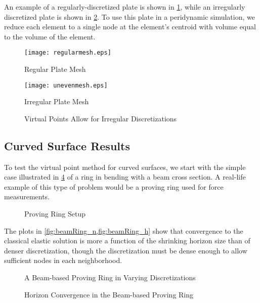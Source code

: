 An example of a regularly-discretized plate is shown in \cref{fig:regularmesh}, while an irregularly discretized plate is shown in \cref{fig:unevenmesh}.
To use this plate in a peridynamic simulation, we reduce each element to a single node at the element's centroid with volume equal to the volume of the element. 
%
\begin{figure}[h]
  \centering
  \texttt{[image: regularmesh.eps]}
  \caption{Regular Plate Mesh}
  \label{fig:regularmesh}
\end{figure}
%
%
\begin{figure}[h]
  \centering
  \texttt{[image: unevenmesh.eps]}
  \caption{Irregular Plate Mesh}
  \label{fig:unevenmesh}
\end{figure}
%
%
\begin{figure}[tbhp]
  \centering
  \resizebox{0.6\linewidth}{!}{}
  \caption{Virtual Points Allow for Irregular Discretizations}
  \label{fig:PlateIrreg}
\end{figure}
%

\FloatBarrier
\subsection{Curved Surface Results}
To test the virtual point method for curved surfaces, we start with the simple case illustrated in \cref{fig:ProvingRing} of a ring in bending with a beam cross section.
A real-life example of this type of problem would be a proving ring used for force measurements.
%
\begin{figure}[tbhp]
  \centering
  
  \caption{Proving Ring Setup}
  \label{fig:ProvingRing}
\end{figure}
%
The plots in \cref{fig:beamRing_n,fig:beamRing_h} show that convergence to the classical elastic solution is more a function of the shrinking horizon size than of denser discretization, though the discretization must be dense enough to allow sufficient nodes in each neighborhood.
%
\begin{figure}[tbhp]
  \centering
  \resizebox{0.8\linewidth}{!}{}
  \caption{A Beam-based Proving Ring in Varying Discretizations}
  \label{fig:beamRing_n}
\end{figure}
%
%
\begin{figure}[tbhp]
  \centering
  \resizebox{0.8\linewidth}{!}{}
  \caption{Horizon Convergence in the Beam-based Proving Ring}
  \label{fig:beamRing_h}
\end{figure}
%

